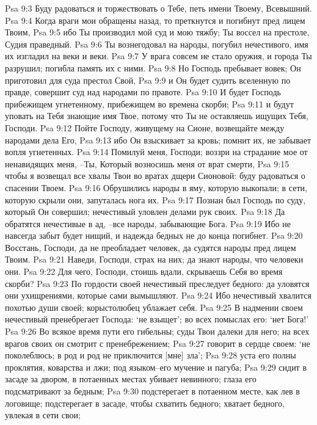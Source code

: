 Psa 9:3  Буду радоваться и торжествовать о Тебе, петь имени Твоему, Всевышний.
Psa 9:4  Когда враги мои обращены назад, то преткнутся и погибнут пред лицем Твоим,
Psa 9:5  ибо Ты производил мой суд и мою тяжбу; Ты воссел на престоле, Судия праведный.
Psa 9:6  Ты вознегодовал на народы, погубил нечестивого, имя их изгладил на веки и веки.
Psa 9:7  У врага совсем не стало оружия, и города Ты разрушил; погибла память их с ними.
Psa 9:8  Но Господь пребывает вовек; Он приготовил для суда престол Свой,
Psa 9:9  и Он будет судить вселенную по правде, совершит суд над народами по правоте.
Psa 9:10  И будет Господь прибежищем угнетенному, прибежищем во времена скорби;
Psa 9:11  и будут уповать на Тебя знающие имя Твое, потому что Ты не оставляешь ищущих Тебя, Господи.
Psa 9:12  Пойте Господу, живущему на Сионе, возвещайте между народами дела Его,
Psa 9:13  ибо Он взыскивает за кровь; помнит их, не забывает вопля угнетенных.
Psa 9:14  Помилуй меня, Господи; воззри на страдание мое от ненавидящих меня, --Ты, Который возносишь меня от врат смерти,
Psa 9:15  чтобы я возвещал все хвалы Твои во вратах дщери Сионовой: буду радоваться о спасении Твоем.
Psa 9:16  Обрушились народы в яму, которую выкопали; в сети, которую скрыли они, запуталась нога их.
Psa 9:17  Познан был Господь по суду, который Он совершил; нечестивый уловлен делами рук своих.
Psa 9:18  Да обратятся нечестивые в ад, --все народы, забывающие Бога.
Psa 9:19  Ибо не навсегда забыт будет нищий, и надежда бедных не до конца погибнет.
Psa 9:20  Восстань, Господи, да не преобладает человек, да судятся народы пред лицем Твоим.
Psa 9:21  Наведи, Господи, страх на них; да знают народы, что человеки они.
Psa 9:22  Для чего, Господи, стоишь вдали, скрываешь Себя во время скорби?
Psa 9:23  По гордости своей нечестивый преследует бедного: да уловятся они ухищрениями, которые сами вымышляют.
Psa 9:24  Ибо нечестивый хвалится похотью души своей; корыстолюбец ублажает себя.
Psa 9:25  В надмении своем нечестивый пренебрегает Господа: `не взыщет'; во всех помыслах его: `нет Бога!'
Psa 9:26  Во всякое время пути его гибельны; суды Твои далеки для него; на всех врагов своих он смотрит с пренебрежением;
Psa 9:27  говорит в сердце своем: `не поколеблюсь; в род и род не приключится [мне] зла';
Psa 9:28  уста его полны проклятия, коварства и лжи; под языком--его мучение и пагуба;
Psa 9:29  сидит в засаде за двором, в потаенных местах убивает невинного; глаза его подсматривают за бедным;
Psa 9:30  подстерегает в потаенном месте, как лев в логовище; подстерегает в засаде, чтобы схватить бедного; хватает бедного, увлекая в сети свои;
